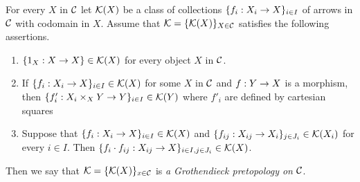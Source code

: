 \begin{definition}
For every $X$ in ${\mathcal C}$ let ${\mathcal K}(X)$ be a class of collections $\{f_i:X_i\rightarrow X\}_{i\in I}$ of arrows in ${\mathcal C}$ with codomain in $X$. Assume that ${\mathcal K}=\{{\mathcal K}(X)\}_{X\in {\mathcal C}}$ satisfies the following assertions.
\begin{enumerate}[label=\textbf{(\arabic*)}, leftmargin=1.5em]
\item $\{1_X:X\rightarrow X\}\in {\mathcal K}(X)$ for every object $X$ in ${\mathcal C}$. 
\item If $\{f_i:X_i\rightarrow X\}_{i\in I}\in {\mathcal K}(X)$ for some $X$ in ${\mathcal C}$ and $f:Y\rightarrow X$ is a morphism, then $\{f'_i:X_i\times_XY\rightarrow Y\}_{i\in I}\in {\mathcal K}(Y)$ where $f'_i$ are defined by cartesian squares
\begin{center}
\end{center}
\item Suppose that $\{f_i:X_i\rightarrow X\}_{i\in I} \in {\mathcal K}(X)$ and $\{f_{ij}:X_{ij}\rightarrow X_i\}_{j\in J_i}\in {\mathcal K}(X_i)$ for every $i\in I$. Then $\{f_i\cdot f_{ij}:X_{ij}\rightarrow X\}_{i\in I,j\in J_i}\in {\mathcal K}(X)$.
\end{enumerate}
Then we say that ${\mathcal K}=\{{\mathcal K}(X)\}_{x\in {\mathcal C}}$ is \textit{a Grothendieck pretopology on ${\mathcal C}$}.
\end{definition}

